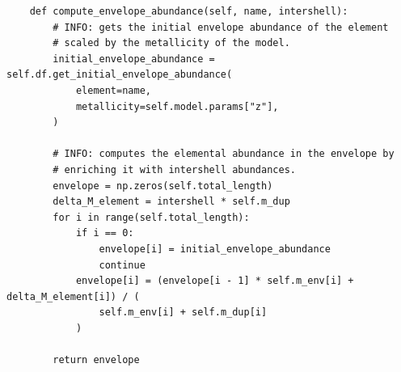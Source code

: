 \documentclass[a4paper,10pt]{article}
\begin{document}
\begin{verbatim}
    def compute_envelope_abundance(self, name, intershell):
        # INFO: gets the initial envelope abundance of the element
        # scaled by the metallicity of the model.
        initial_envelope_abundance = self.df.get_initial_envelope_abundance(
            element=name,
            metallicity=self.model.params["z"],
        )

        # INFO: computes the elemental abundance in the envelope by
        # enriching it with intershell abundances.
        envelope = np.zeros(self.total_length)
        delta_M_element = intershell * self.m_dup
        for i in range(self.total_length):
            if i == 0:
                envelope[i] = initial_envelope_abundance
                continue
            envelope[i] = (envelope[i - 1] * self.m_env[i] + delta_M_element[i]) / (
                self.m_env[i] + self.m_dup[i]
            )

        return envelope
\end{verbatim}
\end{document}
